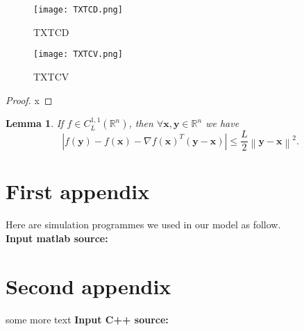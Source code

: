 \documentclass{mcmthesis}
\newcommand{\rmnum}[1]{\romannumeral #1}
\begin{document}
\begin{figure}[H]
\begin{minipage}[htb]{0.5\textwidth}
\centering
\texttt{[image: TXTCD.png]}
\caption{TXTCD} \label{fig:TXTCD}
\end{minipage}
\begin{minipage}[htb]{0.5\textwidth}
\centering
\texttt{[image: TXTCV.png]}
\caption{TXTCV} \label{fig:TXTCV}
\end{minipage}
\end{figure}






\newpage
\setcounter{page}{2}
\pagestyle{fancy} 
\rhead{\small\sffamily  \rmnum{\thepage}}



% 
% 



\begin{appendices}

\begin{proof}   %
  x
\end{proof}

\newtheorem{lemma}{Lemma}%
\begin{lemma}  
If $f\in C_{L}^{1,1}(\mathbb{R}^{n})$, then $\forall \textbf{x},\textbf{y}\in\mathbb{R}^{n}$ we have  
\begin{equation}  
\left|{f(\textbf{y})-f(\textbf{x})-\nabla f(\textbf{x})^{T}(\textbf{y}-\textbf{x})}\right|\le\frac{L}{2}\left\|{\textbf{y}-\textbf{x}}\right\|^{2}.  
\end{equation}  
\end{lemma} 
\section{First appendix}

\lipsum[13]

Here are simulation programmes we used in our model as follow.\\

\textbf{\textcolor[rgb]{0.98,0.00,0.00}{Input matlab source:}}


\section{Second appendix}

some more text \textcolor[rgb]{0.98,0.00,0.00}{\textbf{Input C++ source:}}


\end{appendices}
\end{document}
